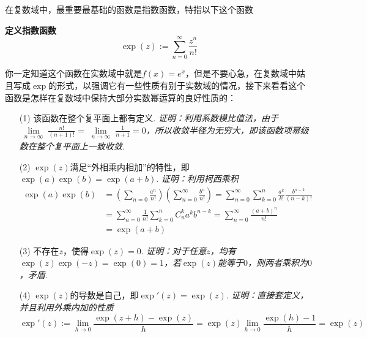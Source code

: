 \documentclass[UTF8]{ctexart}
\newenvironment{definition}[1]
    {\begin{tcolorbox}[enhanced, colback=LightYellow, breakable=false, frame hidden, borderline west={1.5mm}{-2mm}{DarkGreen}]
    {\bfseries {\color{DarkGreen} 定义}\quad #1} \newline}
    {\end{tcolorbox}}
\begin{document}
在复数域中，最重要最基础的函数是指数函数，特指以下这个函数
\begin{definition}{指数函数}
    \[\exp(z) := \sum_{n=0}^{\infty}\frac{z^n}{n!}\]
\end{definition}
你一定知道这个函数在实数域中就是\(f(x)=e^x\)，但是不要心急，在复数域中姑且写成\(\exp\)的形式，以强调它有一些性质有别于实数域的情况，接下来看看这个函数是怎样在复数域中保持大部分实数幂运算的良好性质的：
\begin{itemize}
    \item [(1)] 该函数在整个复平面上都有定义. 
    \newline
    \textit{
        证明：利用系数模比值法，由于\(\displaystyle{\lim \limits_{\substack{n \to \infty}} \frac{n!}{(n+1)!} = \lim \limits_{\substack{n \to \infty}} \frac{1}{n+1} = 0}\)，所以收敛半径为无穷大，即该函数项幂级数在整个复平面上一致收敛.
    }
    \item [(2)] \(\exp(z)\)满足“外相乘内相加”的特性，即\(\exp(a)\exp(b)=\exp(a+b)\).
    \newline
    \textit{
        证明：利用柯西乘积
    }
    \begin{align*}
        \exp(a)\exp(b) &= \left(\sum_{n=0}\frac{a^n}{n!}\right)\left(\sum_{n=0}^{\infty}\frac{b^n}{n!}\right) = \sum_{n=0}^{\infty}\sum_{k=0}^{n}\frac{a^k}{k!}\frac{b^{n-k}}{(n-k)!} \\
        &= \sum_{n=0}^{\infty}\frac{1}{n!}\sum_{k=0}^{n}C_n^ka^kb^{n-k} = \sum_{n=0}^{\infty}\frac{(a+b)^n}{n!} \\
        &= \exp(a+b)
    \end{align*}

    \item [(3)] 不存在\(z\)，使得\(\exp(z)=0\).
    \newline
    \textit{
        证明：对于任意\(z\)，均有\(\exp(z)\exp(-z)=\exp(0)=1\)，若\(\exp(z)\)能等于\(0\)，则两者乘积为\(0\)，矛盾.
    }
    \item [(4)] \(\exp(z)\)的导数是自己，即\(\exp'(z)=\exp(z)\).
    \newline
    \textit{
        证明：直接套定义，并且利用外乘内加的性质
        \[\exp'(z) := \lim_{h \to 0}\frac{\exp(z+h)-\exp(z)}{h} = \exp(z)\lim_{h \to 0}\frac{\exp(h)-1}{h} = \exp(z)\]
    }
\end{itemize}
\end{document}
